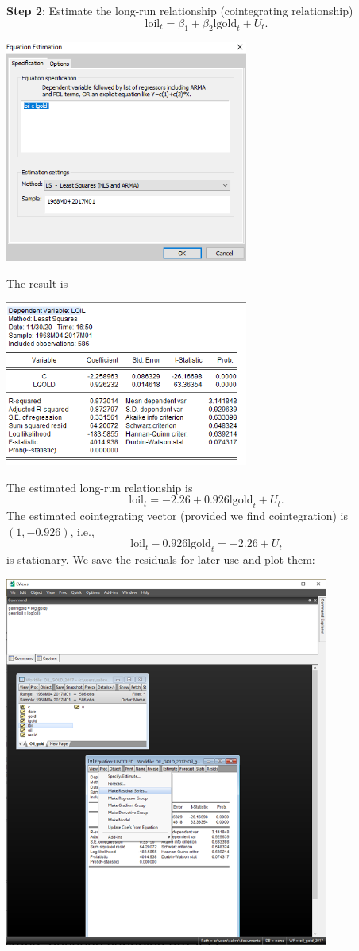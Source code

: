 \documentclass[11pt, a4paper]{article}
\begin{document}
\begin{enumerate}
\begin{enumerate}
\noindent\textbf{Step 2}: Estimate the long-run relationship (cointegrating relationship)
\[
\mbox{loil}_t=\beta_1+\beta_2\mbox{lgold}_t+U_t.
\]
\begin{center}
\includegraphics[width=0.6\textwidth]{longruneviews}
\end{center}
The result is
\begin{center}
\includegraphics[width=0.6\textwidth]{longrun}
\end{center}
The estimated long-run relationship is
\[
\mbox{loil}_t=-2.26+0.926\mbox{lgold}_t+U_t.
\]
The estimated cointegrating vector (provided we find cointegration) is $(1, -0.926)$, i.e.,  \[\mbox{loil}_t-0.926\mbox{lgold}_t=-2.26+U_t\] is stationary. We save the residuals for later use and plot them:
\begin{center}
\includegraphics[width=0.8\textwidth]{residualseviews}

\end{center}
\end{enumerate}
\end{enumerate}
\end{document}
